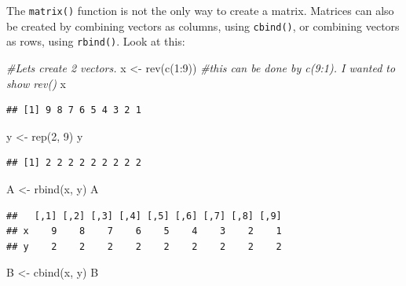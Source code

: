 \documentclass[
]{book}
\newenvironment{Shaded}{\begin{snugshade}}{\end{snugshade}}
\newcommand{\CommentTok}[1]{\textcolor[rgb]{0.56,0.35,0.01}{\textit{#1}}}
\newcommand{\DecValTok}[1]{\textcolor[rgb]{0.00,0.00,0.81}{#1}}
\newcommand{\FunctionTok}[1]{\textcolor[rgb]{0.00,0.00,0.00}{#1}}
\newcommand{\NormalTok}[1]{#1}
\newcommand{\OtherTok}[1]{\textcolor[rgb]{0.56,0.35,0.01}{#1}}
\newcommand{\SpecialCharTok}[1]{\textcolor[rgb]{0.00,0.00,0.00}{#1}}
\begin{document}
The \texttt{matrix()} function is not the only way to create a matrix. Matrices can also be created by combining vectors as columns, using \texttt{cbind()}, or combining vectors as rows, using \texttt{rbind()}. Look at this:

\begin{Shaded}
\begin{Highlighting}[]
\CommentTok{\#Let\textquotesingle{}s create 2 vectors.}
\NormalTok{x }\OtherTok{\textless{}{-}} \FunctionTok{rev}\NormalTok{(}\FunctionTok{c}\NormalTok{(}\DecValTok{1}\SpecialCharTok{:}\DecValTok{9}\NormalTok{))  }\CommentTok{\#this can be done by c(9:1). I wanted to show rev()}
\NormalTok{x}
\end{Highlighting}
\end{Shaded}

\begin{verbatim}
## [1] 9 8 7 6 5 4 3 2 1
\end{verbatim}

\begin{Shaded}
\begin{Highlighting}[]
\NormalTok{y }\OtherTok{\textless{}{-}} \FunctionTok{rep}\NormalTok{(}\DecValTok{2}\NormalTok{, }\DecValTok{9}\NormalTok{)}
\NormalTok{y}
\end{Highlighting}
\end{Shaded}

\begin{verbatim}
## [1] 2 2 2 2 2 2 2 2 2
\end{verbatim}

\begin{Shaded}
\begin{Highlighting}[]
\NormalTok{A }\OtherTok{\textless{}{-}} \FunctionTok{rbind}\NormalTok{(x, y)}
\NormalTok{A}
\end{Highlighting}
\end{Shaded}

\begin{verbatim}
##   [,1] [,2] [,3] [,4] [,5] [,6] [,7] [,8] [,9]
## x    9    8    7    6    5    4    3    2    1
## y    2    2    2    2    2    2    2    2    2
\end{verbatim}

\begin{Shaded}
\begin{Highlighting}[]
\NormalTok{B }\OtherTok{\textless{}{-}} \FunctionTok{cbind}\NormalTok{(x, y)}
\NormalTok{B}
\end{Highlighting}
\end{Shaded}
\end{document}
